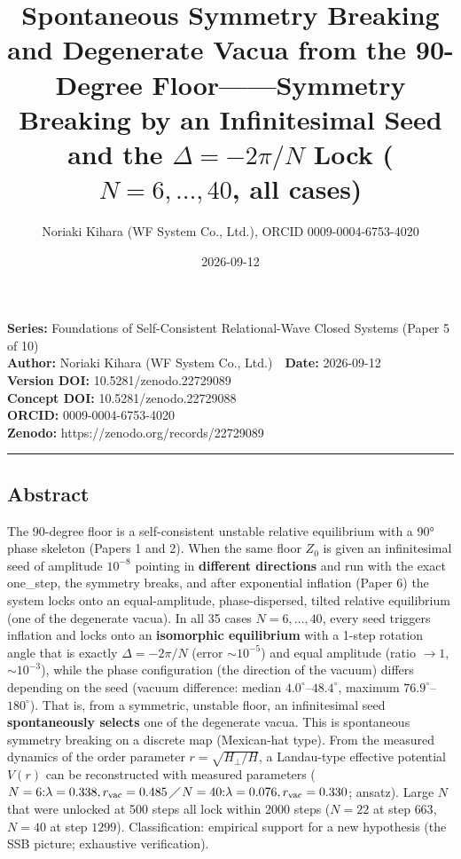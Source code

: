 \documentclass[
  a4paper,
]{ltjsarticle}
\title{Spontaneous Symmetry Breaking and Degenerate Vacua from the
90-Degree Floor------Symmetry Breaking by an Infinitesimal Seed and the
\(\Delta=-2\pi/N\) Lock (\(N=6,\ldots,40\), all cases)}
\author{Noriaki Kihara (WF System Co., Ltd.), ORCID 0009-0004-6753-4020}
\date{2026-09-12}
\begin{document}
\maketitle

\textbf{Series:} Foundations of Self-Consistent Relational-Wave Closed
Systems (Paper 5 of 10)\\
\textbf{Author:} Noriaki Kihara (WF System Co., Ltd.)　\textbf{Date:}
2026-09-12\\
\textbf{Version DOI:} 10.5281/zenodo.22729089\\
\textbf{Concept DOI:} 10.5281/zenodo.22729088\\
\textbf{ORCID:} 0009-0004-6753-4020\\
\textbf{Zenodo:} https://zenodo.org/records/22729089\\

\begin{center}\rule{0.5\linewidth}{0.5pt}\end{center}

\subsection{Abstract}\label{abstract}

The 90-degree floor is a self-consistent unstable relative equilibrium
with a 90° phase skeleton (Papers 1 and 2). When the same floor \(Z_0\)
is given an infinitesimal seed of amplitude \(10^{-8}\) pointing in
\textbf{different directions} and run with the exact one\_step, the
symmetry breaks, and after exponential inflation (Paper 6) the system
locks onto an equal-amplitude, phase-dispersed, tilted relative
equilibrium (one of the degenerate vacua). In all 35 cases
\(N=6,\ldots,40\), every seed triggers inflation and locks onto an
\textbf{isomorphic equilibrium} with a 1-step rotation angle that is
exactly \(\Delta=-2\pi/N\) (error \(\sim10^{-5}\)) and equal amplitude
(ratio \(\to1\), \(\sim10^{-3}\)), while the phase configuration (the
direction of the vacuum) differs depending on the seed (vacuum
difference: median \(4.0^\circ\)--\(48.4^\circ\), maximum
\(76.9^\circ\)--\(180^\circ\)). That is, from a symmetric, unstable
floor, an infinitesimal seed \textbf{spontaneously selects} one of the
degenerate vacua. This is spontaneous symmetry breaking on a discrete
map (Mexican-hat type). From the measured dynamics of the order
parameter \(r=\sqrt{H_\perp/H}\), a Landau-type effective potential
\(V(r)\) can be reconstructed with measured parameters
(\(N=6{:}\lambda=0.338,r_{\rm vac}=0.485\)／\(N=40{:}\lambda=0.076,r_{\rm vac}=0.330\);
ansatz). Large \(N\) that were unlocked at 500 steps all lock within
2000 steps (\(N=22\) at step \(663\), \(N=40\) at step \(1299\)).
Classification: empirical support for a new hypothesis (the SSB picture;
exhaustive verification).
\end{document}
